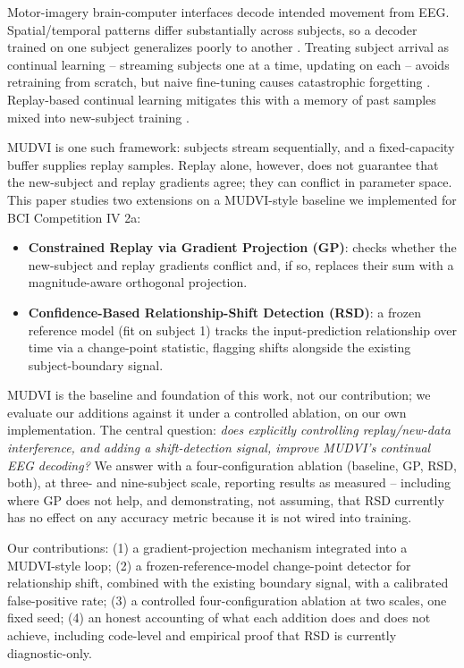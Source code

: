 \documentclass[conference]{IEEEtran}
\begin{document}
Motor-imagery brain-computer interfaces decode intended movement from EEG. Spatial/temporal patterns differ substantially across subjects, so a decoder trained on one subject generalizes poorly to another \cite{lawhern2018eegnet}. Treating subject arrival as continual learning -- streaming subjects one at a time, updating on each -- avoids retraining from scratch, but naive fine-tuning causes catastrophic forgetting \cite{french1999catastrophic}. Replay-based continual learning mitigates this with a memory of past samples mixed into new-subject training \cite{lopezpaz2017gem}.

MUDVI \cite{duan2024mudvi} is one such framework: subjects stream sequentially, and a fixed-capacity buffer supplies replay samples. Replay alone, however, does not guarantee that the new-subject and replay gradients agree; they can conflict in parameter space. This paper studies two extensions on a MUDVI-style baseline we implemented for BCI Competition IV 2a:

\begin{itemize}
\item \textbf{Constrained Replay via Gradient Projection (GP)}: checks whether the new-subject and replay gradients conflict and, if so, replaces their sum with a magnitude-aware orthogonal projection.
\item \textbf{Confidence-Based Relationship-Shift Detection (RSD)}: a frozen reference model (fit on subject 1) tracks the input-prediction relationship over time via a change-point statistic, flagging shifts alongside the existing subject-boundary signal.
\end{itemize}

MUDVI is the baseline and foundation of this work, not our contribution; we evaluate our additions against it under a controlled ablation, on our own implementation. The central question: \emph{does explicitly controlling replay/new-data interference, and adding a shift-detection signal, improve MUDVI's continual EEG decoding?} We answer with a four-configuration ablation (baseline, GP, RSD, both), at three- and nine-subject scale, reporting results as measured -- including where GP does not help, and demonstrating, not assuming, that RSD currently has no effect on any accuracy metric because it is not wired into training.

Our contributions: (1) a gradient-projection mechanism integrated into a MUDVI-style loop; (2) a frozen-reference-model change-point detector for relationship shift, combined with the existing boundary signal, with a calibrated false-positive rate; (3) a controlled four-configuration ablation at two scales, one fixed seed; (4) an honest accounting of what each addition does and does not achieve, including code-level and empirical proof that RSD is currently diagnostic-only.
\end{document}

